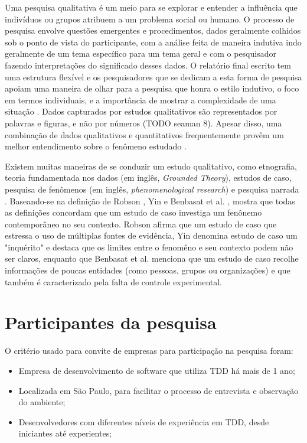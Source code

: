 Uma pesquisa qualitativa é um meio para se explorar e entender a influência que indivíduos ou grupos atribuem a um
problema social ou humano. O processo de pesquisa envolve questões emergentes e procedimentos, dados geralmente colhidos
sob o ponto de vista do participante, com a análise feita de maneira indutiva indo geralmente de um tema específico 
para um tema geral e com o pesquisador fazendo interpretações do significado desses dados. 
O relatório final escrito tem uma estrutura flexível e os pesquisadores que se dedicam a esta forma de pesquisa 
apoiam uma maneira de olhar para a pesquisa que honra o estilo indutivo, o foco em termos individuais, 
e a importância de mostrar a complexidade de uma situação \cite{creswell}. Dados capturados por estudos qualitativos
são representados por palavras e figuras, e não por números (TODO seaman 8). Apesar disso, uma combinação de dados
qualitativos e quantitativos frequentemente provêm um melhor entendimento sobre o fenômeno estudado \cite{seaman}.  

Existem muitas maneiras de se conduzir
um estudo qualitativo, como etnografia, teoria fundamentada nos dados (em inglês, \textit{Grounded Theory}), estudos de caso,
pesquisa de fenômenos (em inglês, \textit{phenomenological research}) e pesquisa narrada \cite{creswell}. 
Baseando-se na definição de Robson \cite{robson}, Yin \cite{yin} e Benbasat et al. \cite{benbasat}, \cite{guidelines-case-study} 
mostra que todas as definições concordam que um estudo de caso investiga um fenônemo contemporâneo no seu contexto. Robson afirma
que um estudo de caso que estressa o uso de múltiplas fontes de evidência, Yin denomina estudo de caso um "inquérito" e
destaca que os limites entre o fenomêno e seu contexto podem não ser claros, enquanto que Benbasat et al. menciona que um estudo
de caso recolhe informações de poucas entidades (como pessoas, grupos ou organizações) e que também é caracterizado pela
falta de controle experimental.

\section{Participantes da pesquisa}
\label{sec:planejamento-participantes}

O critério usado para convite de empresas para participação na pesquisa foram:

\begin{itemize}
	\item Empresa de desenvolvimento de software que utiliza TDD há mais de 1 ano;
	\item Localizada em São Paulo, para facilitar o processo de entrevista e observação do ambiente;
	\item Desenvolvedores com diferentes níveis de experiência em TDD, desde iniciantes até experientes; 
\end{itemize}

